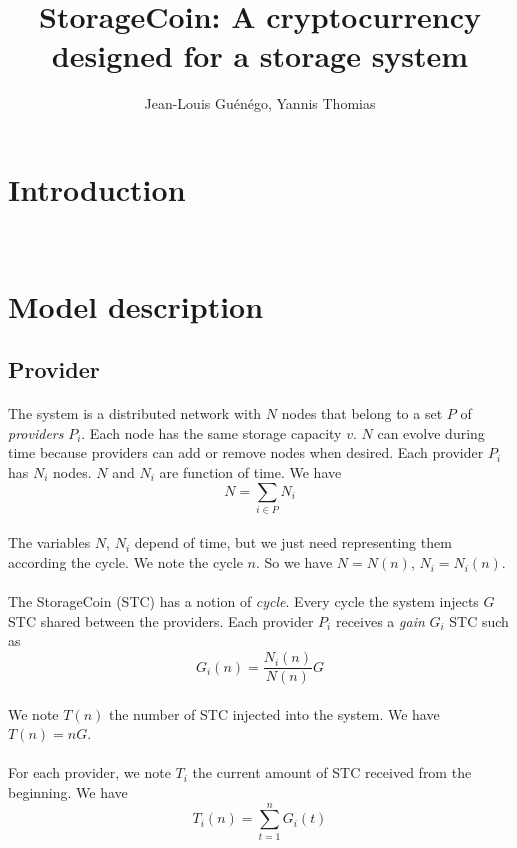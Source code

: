 \documentclass[a4paper,12pt]{article}
\title{StorageCoin: A cryptocurrency designed for a storage system}
\author{Jean-Louis Gu\'{e}n\'{e}go, Yannis Thomias}
\date{}
\begin{document}
\maketitle
\tableofcontents

\section{Introduction}
~\cite{bitcoin}
~\cite{peercoin}
~\cite{smallcell}

\section{Model description}
\subsection{Provider}

\paragraph*{}
The system is a distributed network with $N$ nodes that belong to a set $P$ of \emph{providers} $P_{i}$.
Each node has the same storage capacity $v$.
$N$ can evolve during time because providers can add or remove nodes  when desired. Each provider $P_{i}$ has $N_{i}$ nodes.
$N$ and $N_{i}$ are function of time. We have 
\[N=\sum\limits_{i\in{P}}N_{i}\]

\paragraph*{}
The variables $N$, $N_{i}$ depend of time, but we just need representing them according the cycle. We note the cycle $n$.
So we have $N=N(n)$, $N_{i}=N_{i}(n)$. 

\paragraph*{}
The StorageCoin (STC) has a notion of \emph{cycle}.
Every cycle the system injects $G$ STC shared between the providers.
Each provider $P_{i}$ receives a \emph{gain} $G_{i}$ STC such as
\[G_{i}(n)=\frac{N_{i}(n)}{N(n)}G\]

\paragraph*{}
We note $T(n)$ the number of STC injected into the system. We have $T(n)=nG$.

\paragraph*{}
For each provider, we note $T_{i}$ the current amount of STC received from the beginning. We have
\[T_{i}(n)=\sum\limits_{t=1}^n G_{i}(t)\]
\end{document}
